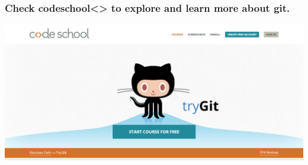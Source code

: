 \documentclass{beamer}
\begin{document}
\begin{frame}
\frametitle{ Check codeschool<> to explore and learn more about git.}
\includegraphics[scale=0.2]{codeschool.png}
\end{frame}




\end{document}
